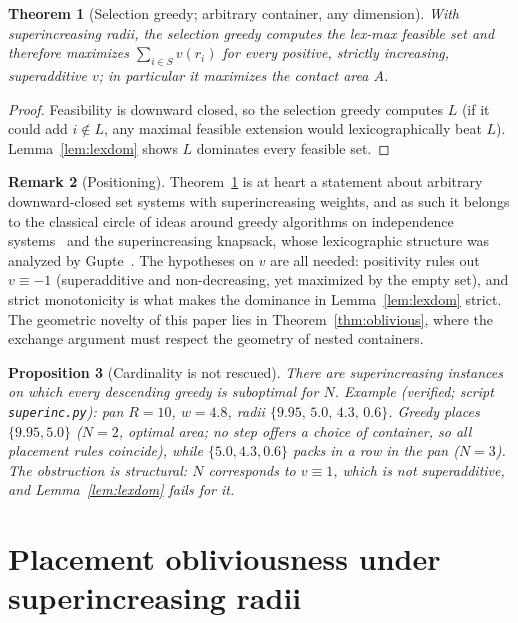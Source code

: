 \documentclass[11pt]{article}
\newtheorem{theorem}{Theorem}
\newtheorem{proposition}[theorem]{Proposition}
\theoremstyle{definition}
\newtheorem{remark}[theorem]{Remark}
\begin{document}
\begin{theorem}[Selection greedy; arbitrary container, any dimension]
\label{thm:selection}
With superincreasing radii, the selection greedy computes the lex-max feasible
set and therefore maximizes $\sum_{i\in S}v(r_i)$ for every positive,
strictly increasing, superadditive $v$; in particular it maximizes the
contact area $A$.
\end{theorem}
\begin{proof}
Feasibility is downward closed, so the selection greedy computes $L$
(if it could add $i\notin L$, any maximal feasible extension would
lexicographically beat $L$). Lemma~\ref{lem:lexdom} shows $L$ dominates every
feasible set.
\end{proof}

\begin{remark}[Positioning]
Theorem~\ref{thm:selection} is at heart a statement about arbitrary
downward-closed set systems with superincreasing weights, and as such it
belongs to the classical circle of ideas around greedy algorithms on
independence systems~\cite{Edmonds1971,KorteHausmann1978} and the
superincreasing knapsack, whose lexicographic structure was analyzed by
Gupte~\cite{Gupte2016}. The hypotheses on $v$ are all needed: positivity
rules out $v\equiv-1$ (superadditive and non-decreasing, yet maximized by
the empty set), and strict monotonicity is what makes the dominance in
Lemma~\ref{lem:lexdom} strict. The geometric novelty of this paper lies in
Theorem~\ref{thm:oblivious}, where the exchange argument must respect the
geometry of nested containers.
\end{remark}

\begin{proposition}[Cardinality is not rescued]\label{prop:count}
There are superincreasing instances on which every descending greedy is
suboptimal for $N$. Example (verified; script \texttt{superinc.py}): pan $R=10$, $w=4.8$, radii
$\{9.95,\,5.0,\,4.3,\,0.6\}$. Greedy places $\{9.95,5.0\}$ ($N=2$, optimal
area; no step offers a choice of container, so all placement rules coincide),
while $\{5.0,4.3,0.6\}$ packs in a row in the pan ($N=3$).
The obstruction is structural: $N$ corresponds to $v\equiv1$, which is not
superadditive, and Lemma~\ref{lem:lexdom} fails for it.
\end{proposition}

\section{Placement obliviousness under superincreasing radii}
\label{sec:oblivious}
\end{document}
